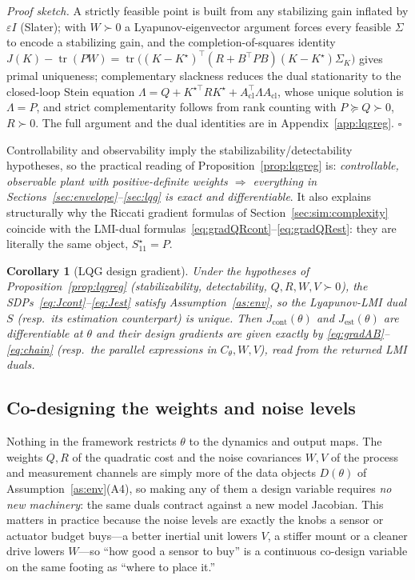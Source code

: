\documentclass[twocolumn,amsthm]{autart}
\newtheorem{corollary}{Corollary}
\begin{document}
\emph{Proof sketch.} A strictly feasible point is built from any stabilizing gain
inflated by $\varepsilon I$ (Slater); with $W\succ0$ a Lyapunov-eigenvector
argument forces every feasible $\Sigma$ to encode a stabilizing gain, and the
completion-of-squares identity $J(K)-\operatorname{tr}(PW)=\operatorname{tr}\!\big(
(K-K^\star)^\top(R+B^\top PB)(K-K^\star)\Sigma_K\big)$ gives primal uniqueness;
complementary slackness reduces the dual stationarity to the closed-loop Stein
equation $\Lambda=Q+K^{\star\top}RK^\star+A_{\mathrm{cl}}^\top\Lambda
A_{\mathrm{cl}}$, whose unique solution is $\Lambda=P$, and strict
complementarity follows from rank counting with $P\succeq Q\succ0$, $R\succ0$.
The full argument and the dual identities are in Appendix~\ref{app:lqgreg}.
\hfill$\square$

Controllability and observability imply the stabilizability/detectability
hypotheses, so the practical reading of Proposition~\ref{prop:lqgreg} is:
\emph{controllable, observable plant with positive-definite weights $\Rightarrow$
everything in Sections~\ref{sec:envelope}--\ref{sec:lqg} is exact and
differentiable}. It also explains structurally why the Riccati gradient formulas
of Section~\ref{sec:sim:complexity} coincide with the LMI-dual
formulas~\eqref{eq:gradQRcont}--\eqref{eq:gradQRest}: they are literally the same
object, $S_{11}^\star=P$.

\begin{corollary}[LQG design gradient]\label{cor:lqg}
Under the hypotheses of Proposition~\ref{prop:lqgreg} (stabilizability,
detectability, $Q,R,W,V\succ0$), the SDPs~\eqref{eq:Jcont}--\eqref{eq:Jest}
satisfy Assumption~\ref{as:env}, so the Lyapunov-LMI dual $S$ (resp.\ its
estimation counterpart) is unique. Then $J_{\mathrm{cont}}(\theta)$ and
$J_{\mathrm{est}}(\theta)$ are differentiable at $\theta$ and their design
gradients are given exactly by \eqref{eq:gradAB}--\eqref{eq:chain} (resp.\ the
parallel expressions in $C_\theta, W, V$), read from the returned LMI duals.
\end{corollary}

\subsection{Co-designing the weights and noise levels}\label{sec:weights}

Nothing in the framework restricts $\theta$ to the dynamics and output maps. The
weights $Q, R$ of the quadratic cost and the noise covariances $W, V$ of the
process and measurement channels are simply more of the data objects $D(\theta)$
of Assumption~\ref{as:env}(A4), so making any of them a design variable requires
\emph{no new machinery}: the same duals contract against a new model Jacobian.
This matters in practice because the noise levels are exactly the knobs a sensor
or actuator budget buys---a better inertial unit lowers $V$, a stiffer mount or a
cleaner drive lowers $W$---so ``how good a sensor to buy'' is a continuous
co-design variable on the same footing as ``where to place it.''
\end{document}
